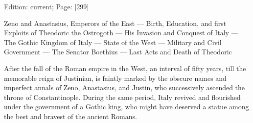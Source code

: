 Edition: current; Page: [299]


Zeno and Anastasius, Emperors of the East \texthebrew{—} Birth, Education, and first Exploits of Theodoric the Ostrogoth \texthebrew{—} His Invasion and Conquest of Italy \texthebrew{—} The Gothic Kingdom of Italy \texthebrew{—} State of the West \texthebrew{—} Military and Civil Government \texthebrew{—} The Senator Boethius \texthebrew{—} Last Acts and Death of Theodoric

After the fall of the Roman empire in the West, an interval of fifty years, till the memorable reign of Justinian, is faintly marked by the obscure names and imperfect annals of Zeno, Anastasius, and Justin, who successively ascended the throne of Constantinople. During the same period, Italy revived and flourished under the government of a Gothic king, who might have deserved a statue among the best and bravest of the ancient Romans.

